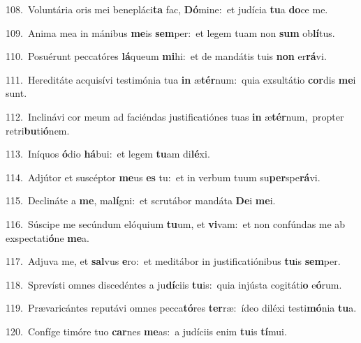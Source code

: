 {\numbfont\textcolor{\numbcolor}{108.}}~Voluntária oris mei benepláci\textbf{ta} fac, \textbf{Dó}\-mine:~\star et judícia \textbf{tu}\-a \textbf{do}\-ce me.\par
{\numbfont\textcolor{\numbcolor}{109.}}~Anima mea in mánibus \textbf{me}\-is \textbf{sem}\-per:~\star et legem tuam non \textbf{sum} ob\-\textbf{lí}\-tus.\par
{\numbfont\textcolor{\numbcolor}{110.}}~Posuérunt peccatóres \textbf{lá}\-queum \textbf{mi}\-hi:~\star et de mandátis tuis \textbf{non} er\-\textbf{rá}\-vi.\par
{\numbfont\textcolor{\numbcolor}{111.}}~Hereditáte acquisívi testimónia tua \textbf{in} æ\-\textbf{tér}\-num:~\star quia exsultátio \textbf{cor}\-dis \textbf{me}\-i sunt.\par
{\numbfont\textcolor{\numbcolor}{112.}}~Inclinávi cor meum ad faciéndas justificatiónes tuas \textbf{in} æ\-\textbf{tér}\-num,~\star propter retri\-\textbf{bu}\-ti\-\textbf{ó}\-nem.\par
{\numbfont\textcolor{\numbcolor}{113.}}~Iníquos \textbf{ó}\-dio \textbf{há}\-bui:~\star et legem \textbf{tu}\-am di\-\textbf{lé}\-xi.\par
{\numbfont\textcolor{\numbcolor}{114.}}~Adjútor et suscéptor \textbf{me}\-us \textbf{es} tu:~\star et in verbum tuum su\-\textbf{per}\-spe\-\textbf{rá}\-vi.\par
{\numbfont\textcolor{\numbcolor}{115.}}~Declináte a \textbf{me}\-, ma\-\textbf{lí}\-gni:~\star et scrutábor mandáta \textbf{De}\-i \textbf{me}\-i.\par
{\numbfont\textcolor{\numbcolor}{116.}}~Súscipe me secúndum elóquium \textbf{tu}\-um, et \textbf{vi}\-vam:~\star et non confúndas me ab exspectati\-\textbf{ó}\-ne \textbf{me}\-a.\par
{\numbfont\textcolor{\numbcolor}{117.}}~Adjuva me, et \textbf{sal}\-vus \textbf{e}\-ro:~\star et meditábor in justificatiónibus \textbf{tu}\-is \textbf{sem}\-per.\par
{\numbfont\textcolor{\numbcolor}{118.}}~Sprevísti omnes discedéntes a ju\-\textbf{dí}\-ciis \textbf{tu}\-is:~\star quia injústa cogitáti\textbf{o} e\-\textbf{ó}\-rum.\par
{\numbfont\textcolor{\numbcolor}{119.}}~Prævaricántes reputávi omnes pecca\-\textbf{tó}\-res \textbf{ter}\-ræ:~\star ídeo diléxi testi\-\textbf{mó}\-nia \textbf{tu}\-a.\par
{\numbfont\textcolor{\numbcolor}{120.}}~Confíge timóre tuo \textbf{car}\-nes \textbf{me}\-as:~\star a judíciis enim \textbf{tu}\-is \textbf{tí}\-mui.\par
